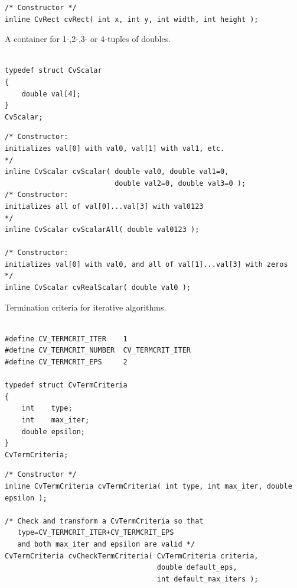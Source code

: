 \begin{lstlisting}
/* Constructor */
inline CvRect cvRect( int x, int y, int width, int height );

\end{lstlisting}

\label{CvScalar}

A container for 1-,2-,3- or 4-tuples of doubles.

\begin{lstlisting}

typedef struct CvScalar
{
    double val[4];
}
CvScalar;

\end{lstlisting}

\begin{lstlisting}
/* Constructor: 
initializes val[0] with val0, val[1] with val1, etc. 
*/
inline CvScalar cvScalar( double val0, double val1=0,
                          double val2=0, double val3=0 );
/* Constructor: 
initializes all of val[0]...val[3] with val0123 
*/
inline CvScalar cvScalarAll( double val0123 );

/* Constructor: 
initializes val[0] with val0, and all of val[1]...val[3] with zeros 
*/
inline CvScalar cvRealScalar( double val0 );

\end{lstlisting}

\label{CvTermCriteria}

Termination criteria for iterative algorithms.

\begin{lstlisting}

#define CV_TERMCRIT_ITER    1
#define CV_TERMCRIT_NUMBER  CV_TERMCRIT_ITER
#define CV_TERMCRIT_EPS     2

typedef struct CvTermCriteria
{
    int    type;
    int    max_iter; 
    double epsilon; 
}
CvTermCriteria;
\end{lstlisting}

\begin{description}
\end{description}

\begin{lstlisting}
/* Constructor */
inline CvTermCriteria cvTermCriteria( int type, int max_iter, double epsilon );

/* Check and transform a CvTermCriteria so that 
   type=CV_TERMCRIT_ITER+CV_TERMCRIT_EPS
   and both max_iter and epsilon are valid */
CvTermCriteria cvCheckTermCriteria( CvTermCriteria criteria,
                                    double default_eps,
                                    int default_max_iters );

\end{lstlisting}

